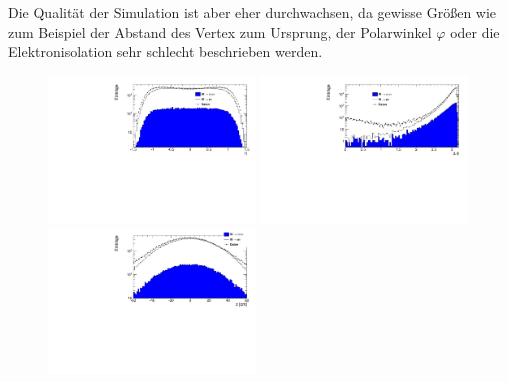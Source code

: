\documentclass[a4paper,12pt]{article}
\begin{document}
Die Qualität der Simulation ist aber eher durchwachsen, da gewisse Größen wie zum Beispiel der
Abstand des Vertex zum Ursprung, der Polarwinkel $φ$ oder die Elektronisolation sehr schlecht
beschrieben werden.

\begin{figure}[h]
	\centering
	\newcommand{\halftext}{0.49\textwidth}
	\includegraphics[width=\halftext]{manualplots/eta.pdf}
	\includegraphics[width=\halftext]{manualplots/delta_phi.pdf}\\
	\includegraphics[width=\halftext]{manualplots/vertex_z.pdf}

\end{figure}
\end{document}
